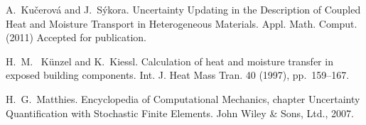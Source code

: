 
\begin{thebibliography}{10}
{\sc A.~Ku\v{c}erov\'a and J.~S\'ykora}.
{Uncertainty Updating in the Description of Coupled Heat and Moisture Transport in Heterogeneous Materials}. Appl. Math. Comput. (2011) Accepted for publication.

{\sc H.~M.~ K\"{u}nzel and K.~Kiessl}. {Calculation of heat and moisture transfer in exposed building components}. Int. J. Heat Mass Tran. 40 (1997), pp.~159--167.

{\sc H.~G.~Matthies}. {Encyclopedia of Computational Mechanics}, chapter Uncertainty Quantification with Stochastic Finite Elements. John Wiley \& Sons, Ltd., 2007.
\end{thebibliography}